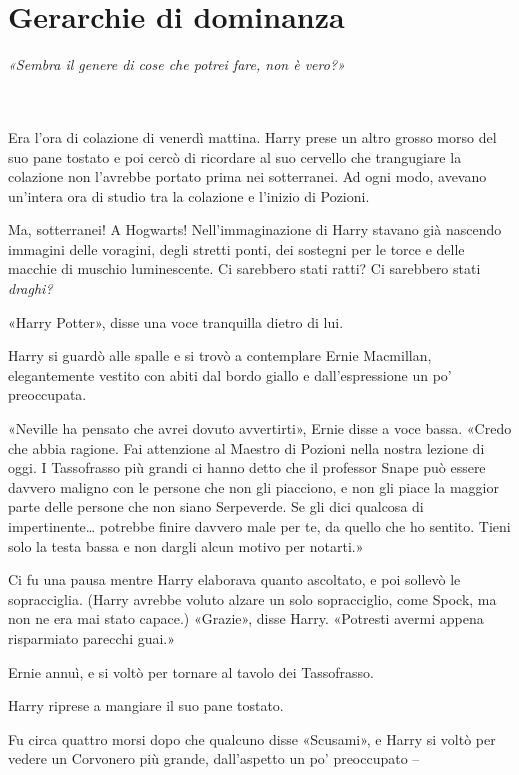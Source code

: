 
\chapter{Gerarchie di dominanza}
\label{capitolo:18}

\emph{«Sembra il genere di cose che potrei fare, non è vero?»}

~\\
~\\


Era l’ora di colazione di venerdì mattina. Harry prese un altro grosso morso del suo pane tostato e poi cercò di ricordare al suo cervello che trangugiare la colazione non l’avrebbe portato prima nei sotterranei. Ad ogni modo, avevano un’intera ora di studio tra la colazione e l’inizio di Pozioni.

Ma, sotterranei! A Hogwarts! Nell’immaginazione di Harry stavano già nascendo immagini delle voragini, degli stretti ponti, dei sostegni per le torce e delle macchie di muschio luminescente. Ci sarebbero stati ratti? Ci sarebbero stati \textit{draghi?}

«Harry Potter», disse una voce tranquilla dietro di lui.

Harry si guardò alle spalle e si trovò a contemplare Ernie Macmillan, elegantemente vestito con abiti dal bordo giallo e dall’espressione un po’ preoccupata.

«Neville ha pensato che avrei dovuto avvertirti», Ernie disse a voce bassa. «Credo che abbia ragione. Fai attenzione al Maestro di Pozioni nella nostra lezione di oggi. I Tassofrasso più grandi ci hanno detto che il professor Snape può essere davvero maligno con le persone che non gli piacciono, e non gli piace la maggior parte delle persone che non siano Serpeverde. Se gli dici qualcosa di impertinente… potrebbe finire davvero male per te, da quello che ho sentito. Tieni solo la testa bassa e non dargli alcun motivo per notarti.»

Ci fu una pausa mentre Harry elaborava quanto ascoltato, e poi sollevò le sopracciglia. (Harry avrebbe voluto alzare un solo sopracciglio, come Spock, ma non ne era mai stato capace.) «Grazie», disse Harry. «Potresti avermi appena risparmiato parecchi guai.»

Ernie annuì, e si voltò per tornare al tavolo dei Tassofrasso.

Harry riprese a mangiare il suo pane tostato.

Fu circa quattro morsi dopo che qualcuno disse «Scusami», e Harry si voltò per vedere un Corvonero più grande, dall’aspetto un po’ preoccupato –

